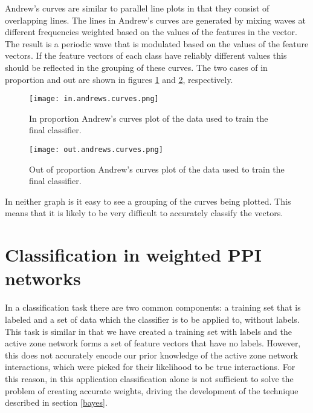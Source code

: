 Andrew's curves are similar to parallel line plots in that they consist of overlapping lines.
The lines in Andrew's curves are generated by mixing waves at different frequencies weighted based on the values of the features in the vector\autocite{andrews_plots_1972}.
The result is a periodic wave that is modulated based on the values of the feature vectors.
If the feature vectors of each class have reliably different values this should be reflected in the grouping of these curves.
The two cases of in proportion and out are shown in figures \ref{fig:inandcurve} and \ref{fig:outandcurve}, respectively.

\begin{figure}
    \centering
    \texttt{[image: in.andrews.curves.png]}
    \caption{In proportion Andrew's curves plot of the data used to train the final classifier.}
    \label{fig:inandcurve}
\end{figure}

\begin{figure}
    \centering
    \texttt{[image: out.andrews.curves.png]}
    \caption{Out of proportion Andrew's curves plot of the data used to train the final classifier.}
    \label{fig:outandcurve}
\end{figure}

In neither graph is it easy to see a grouping of the curves being plotted.
This means that it is likely to be very difficult to accurately classify the vectors.

\section{Classification in weighted PPI networks}

In a classification task there are two common components: a training set that is labeled and a set of data which the classifier is to be applied to, without labels.
This task is similar in that we have created a training set with labels and the active zone network forms a set of feature vectors that have no labels.
However, this does not accurately encode our prior knowledge of the active zone network interactions, which were picked for their likelihood to be true interactions.
For this reason, in this application classification alone is not sufficient to solve the problem of creating accurate weights, driving the development of the technique described in section \ref{bayes}.

